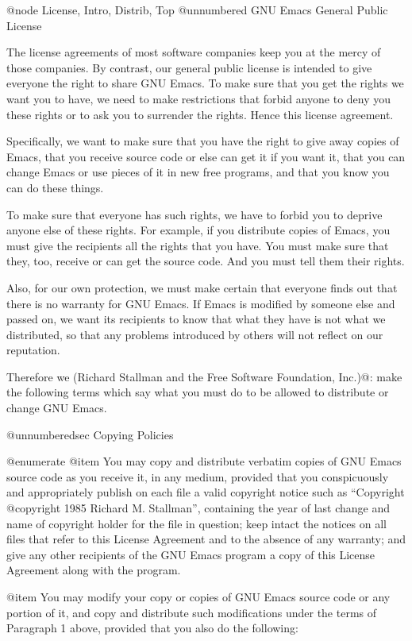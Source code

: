 @node License, Intro, Distrib, Top
@unnumbered GNU Emacs General Public License

  The license agreements of most software companies keep you at the
mercy of those companies.  By contrast, our general public license is
intended to give everyone the right to share GNU Emacs.  To make
sure that you get the rights we want you to have, we need to make
restrictions that forbid anyone to deny you these rights or to ask you
to surrender the rights.  Hence this license agreement.

  Specifically, we want to make sure that you have the right to give
away copies of Emacs, that you receive source code or else can get it
if you want it, that you can change Emacs or use pieces of it in new
free programs, and that you know you can do these things.

  To make sure that everyone has such rights, we have to forbid you to
deprive anyone else of these rights.  For example, if you distribute
copies of Emacs, you must give the recipients all the rights that you
have.  You must make sure that they, too, receive or can get the
source code.  And you must tell them their rights.

  Also, for our own protection, we must make certain that everyone
finds out that there is no warranty for GNU Emacs.  If Emacs is
modified by someone else and passed on, we want its recipients to know
that what they have is not what we distributed, so that any problems
introduced by others will not reflect on our reputation.

  Therefore we (Richard Stallman and the Free Software Foundation, Inc.)@:
make the following terms which say what you must do to be allowed to
distribute or change GNU Emacs.

@unnumberedsec Copying Policies

@enumerate
@item
You may copy and distribute verbatim copies of GNU Emacs source
code as you receive it, in any medium, provided that you conspicuously
and appropriately publish on each file a valid copyright notice such
as ``Copyright @copyright{} 1985 Richard M. Stallman'', containing the year of
last change and name of copyright holder for the file in question;
keep intact the notices on all files that refer to this License
Agreement and to the absence of any warranty; and give any other
recipients of the GNU Emacs program a copy of this License Agreement
along with the program.

@item
You may modify your copy or copies of GNU Emacs source code or
any portion of it, and copy and distribute such modifications under
the terms of Paragraph 1 above, provided that you also do the following:

